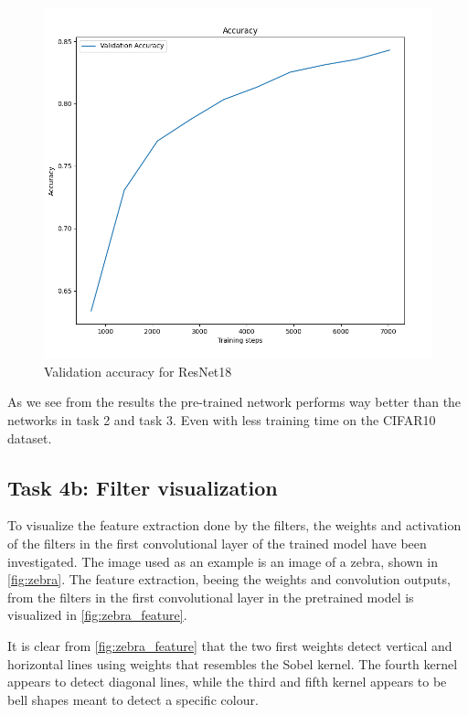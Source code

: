 \documentclass{article}
\begin{document}
\begin{figure}[H]
    \centering
    \includegraphics[width = \textwidth]{Assignments/Assignment_3/plots/task4a_plot_acc.png}
    \caption{Validation accuracy for ResNet18}
    \label{fig:4aacc}
\end{figure}




As we see from the results the pre-trained network performs way better than the networks in task 2 and task 3. Even with less training time on the CIFAR10 dataset.  







\subsection{Task 4b: Filter visualization}
To visualize the feature extraction done by the filters, the weights and activation of the filters in the first convolutional layer of the trained model have been investigated. The image used as an example is an image of a zebra, shown in \autoref{fig:zebra}. The feature extraction, beeing the weights and convolution outputs, from the filters in the first convolutional layer in the pretrained model is visualized in \ref{fig:zebra_feature}.

It is clear from \autoref{fig:zebra_feature} that the two first weights detect vertical and horizontal lines using weights that resembles the Sobel kernel. The fourth kernel appears to detect diagonal lines, while the third and fifth kernel appears to be bell shapes meant to detect a specific colour. 
\end{document}
